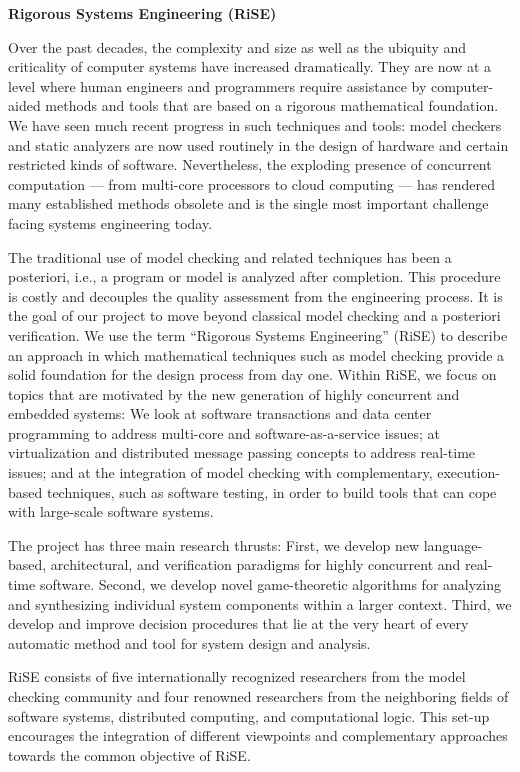 {\bf{Rigorous Systems Engineering (RiSE\xspace)}}

Over the past decades, the complexity and size as well as the ubiquity
and criticality of computer systems have increased dramatically.  They are now at a level
where human engineers and programmers require assistance by
computer-aided methods and tools that are based on a rigorous
mathematical foundation.  We have seen much recent progress in such
techniques and tools: model checkers and static analyzers are now
used routinely in the design of hardware and certain restricted kinds
of software.  Nevertheless, the exploding presence of concurrent computation --- from multi-core processors to cloud computing --- has rendered many established methods obsolete and is the single most important challenge facing systems engineering today.

The traditional use of model checking and related techniques has been a posteriori, i.e., a program or model is analyzed after completion. This procedure is costly and decouples the quality assessment from the engineering process.  It is the goal of our project to move beyond classical model checking and a posteriori verification.  We use the term ``Rigorous Systems Engineering'' (RiSE\xspace) to describe an approach in which mathematical techniques such as model checking provide a solid foundation for the design process from day one.  Within RiSE\xspace, we focus on topics that are motivated by the new generation of highly concurrent and embedded systems: We look at software transactions and data center programming to address multi-core and software-as-a-service issues; at virtualization and distributed message passing concepts to address real-time issues; and at the integration of model checking with complementary, execution-based techniques, such as software testing, in order to build tools that can cope with large-scale software systems.

The project has three main research thrusts: First, we develop new language-based, architectural, and verification paradigms for highly concurrent and real-time software.  Second, we develop novel game-theoretic algorithms for analyzing and synthesizing individual system components within a larger context.  Third, we develop and improve decision procedures that lie at the very heart of every automatic method and tool for system design and analysis.  

RiSE\xspace consists of five internationally recognized researchers from the model checking community and four renowned researchers from the neighboring fields of software systems, distributed computing, and computational logic.  This set-up encourages the integration of different viewpoints and complementary approaches towards the common objective of RiSE\xspace.